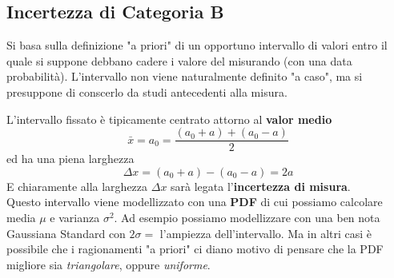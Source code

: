 \documentclass[a4paper,11pt]{report}
\begin{document}
\subsection{Incertezza di Categoria B}
Si basa sulla definizione "a priori" di un opportuno intervallo di valori entro il quale si suppone debbano cadere i valore del misurando (con una data probabilità). L'intervallo non viene naturalmente definito "a caso", ma si presuppone di conscerlo da studi antecedenti alla misura.

L'intervallo fissato è tipicamente centrato attorno al \textbf{valor medio}
$$\bar{x} = a_0 = \frac{(a_0+a)+(a_0-a)}{2}$$ ed ha una piena larghezza $$\Delta x = (a_0+a)-(a_0-a) = 2a$$
E chiaramente alla larghezza $\Delta x$ sarà legata l'\textbf{incertezza di misura}.\\
Questo intervallo viene modellizzato con una \textbf{PDF} di cui possiamo calcolare media $\mu$ e varianza $\sigma^2$. Ad esempio possiamo modellizzare con una ben nota Gaussiana Standard con $2\sigma = $ l'ampiezza dell'intervallo. Ma in altri casi è possibile che i ragionamenti "a priori" ci diano motivo di pensare che la PDF migliore sia \textit{triangolare}, oppure \textit{uniforme}.\\
\end{document}
